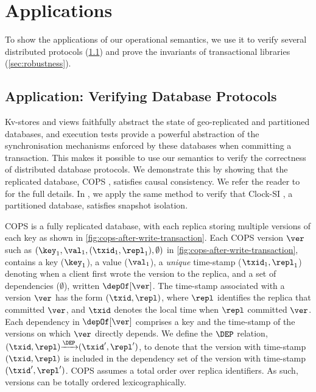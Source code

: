 \section{Applications}
\label{sec:applications}

To show the applications of our operational semantics, 
we use it to verify several distributed protocols (\cref{sec:verify-impl}) and
prove the invariants of transactional libraries (\cref{sec:robustness}).

\subsection{Application: Verifying Database Protocols}
\label{sec:verify-impl}
Kv-stores and views faithfully abstract the state of geo-replicated and partitioned
databases, and execution tests provide a powerful abstraction of the synchronisation mechanisms 
enforced by these databases when committing a transaction. 
This makes it possible to use our 
semantics to verify the correctness of distributed database protocols. 
We demonstrate this by showing that the replicated database,
COPS \cite{cops}, satisfies causal consistency.
We refer the reader to \cite{shale-phd} for the full details.
In \cite{shale-phd}, we apply the same method to verify that 
Clock-SI \cite{clocksi}, a partitioned database, satisfies snapshot isolation.



COPS is a fully replicated database, with each replica storing multiple versions of each key as shown in \cref{fig:cops-after-write-transaction}. 
Each COPS version \( \ver \)
such as \( (\key_1,\val_1,(\txid_1,\repl_1), \emptyset) \) in \cref{fig:cops-after-write-transaction},
contains a key ($\key_1$), a value ($\val_1$), a \emph{unique} time-stamp ($\txid_1, \repl_1$) denoting
when a client first wrote the version to the replica, 
and a set of dependencies ($\emptyset$), written $\depOf[\ver]$. 
The time-stamp associated with a version $\ver$ has the form $(\txid, \repl)$, where $\repl$ identifies the replica that committed $\ver$, 
and $\txid$ denotes the local time when $\repl$ committed $\ver$. 
Each dependency in $\depOf[\ver]$ comprises a key and the time-stamp of the versions on which $\ver$ directly depends.  
We define the \( \DEP \) relation, \( (\txid,\repl) {\xrightarrow{\DEP}} (\txid',\repl') \),
to denote that the version with time-stamp \( (\txid,\repl) \) is included in the dependency set of the version with time-stamp \( (\txid',\repl')\).
COPS assumes a total order over replica identifiers. 
As such, versions can be totally ordered lexicographically. 

